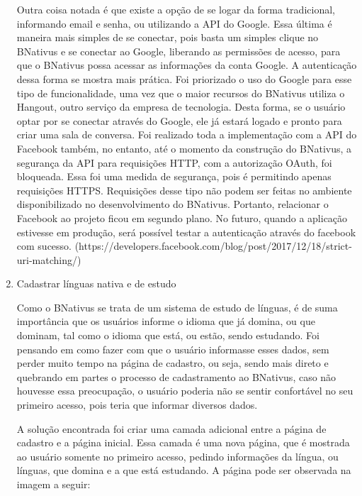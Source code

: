 \begin{enumerate}
    Outra coisa notada é que existe a opção de se logar da forma tradicional, informando email e senha, ou utilizando a API do Google. Essa última é maneira mais simples de se conectar, pois basta um simples clique no BNativus e se conectar ao Google, liberando as permissões de acesso, para que o BNativus possa acessar as informações da conta Google. A autenticação dessa forma se mostra mais prática. Foi priorizado o uso do Google para esse tipo de funcionalidade, uma vez que o maior recursos do BNativus utiliza o Hangout, outro serviço da empresa de tecnologia. Desta forma, se o usuário optar por se conectar através do Google, ele já estará logado e pronto para criar uma sala de conversa. Foi realizado toda a implementação com a API do Facebook também, no entanto, até o momento da construção do BNativus, a segurança da API para requisições HTTP, com a autorização OAuth, foi bloqueada. Essa foi uma medida de segurança, pois é permitindo apenas requisições HTTPS. Requisições desse tipo não podem ser feitas no ambiente disponibilizado no desenvolvimento do BNativus. Portanto, relacionar o Facebook ao projeto ficou em segundo plano. No futuro, quando a aplicação estivesse em produção, será possível testar a autenticação através do facebook com sucesso.  (https://developers.facebook.com/blog/post/2017/12/18/strict-uri-matching/)

\item Cadastrar línguas nativa e de estudo

    Como o BNativus se trata de um sistema de estudo de línguas, é de suma importância que os usuários informe o idioma que já domina, ou que dominam, tal como o idioma que está, ou estão, sendo estudando. Foi pensando em como fazer com que o usuário informasse esses dados, sem perder muito tempo na página de cadastro, ou seja, sendo mais direto e quebrando em partes o processo de cadastramento ao BNativus, caso não houvesse essa preocupação, o usuário poderia não se sentir confortável no seu primeiro acesso, pois teria que informar diversos dados.
    
    A solução encontrada foi criar uma camada adicional entre a página de cadastro e a página inicial. Essa camada é uma nova página, que é mostrada ao usuário somente no primeiro acesso, pedindo informações da língua, ou línguas, que domina e a que está estudando. A página pode ser observada na imagem a seguir:
    
    \newpage
    

\end{enumerate}
